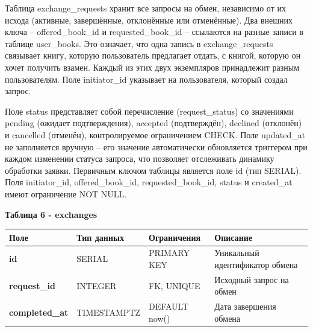 \documentclass[14pt,a4paper]{extarticle}
\begin{document}
Таблица exchange\_requests хранит все запросы на обмен, независимо от их
исхода (активные, завершённые, отклонённые или отменённые). Два внешних
ключа -- offered\_book\_id и requested\_book\_id -- ссылаются на разные
записи в таблице user\_books. Это означает, что одна запись в
exchange\_requests связывает книгу, которую пользователь предлагает
отдать, с книгой, которую он хочет получить взамен. Каждый из этих двух
экземпляров принадлежит разным пользователям. Поле initiator\_id
указывает на пользователя, который создал запрос.

Поле status представляет собой перечисление (request\_status) со
значениями pending (ожидает подтверждения), accepted (подтверждён),
declined (отклонён) и cancelled (отменён), контролируемое ограничением
CHECK. Поле updated\_at не заполняется вручную -- его значение
автоматически обновляется триггером при каждом изменении статуса
запроса, что позволяет отслеживать динамику обработки заявки. Первичным
ключом таблицы является поле id (тип SERIAL). Поля initiator\_id,
offered\_book\_id, requested\_book\_id, status и created\_at имеют
ограничение NOT NULL.

\textbf{Таблица 6 - exchanges}


\begin{longtable}[]{@{}
  >{\centering\arraybackslash}p{}
  >{\centering\arraybackslash}p{}
  >{\centering\arraybackslash}p{}
  >{\centering\arraybackslash}p{}@{}}
\toprule\noalign{}
\begin{minipage}[b]{\linewidth}\centering
\textbf{Поле}
\end{minipage} & \begin{minipage}[b]{\linewidth}\centering
\textbf{Тип данных}
\end{minipage} & \begin{minipage}[b]{\linewidth}\centering
\textbf{Ограничения}
\end{minipage} & \begin{minipage}[b]{\linewidth}\centering
\textbf{Описание}
\end{minipage} \\
\midrule\noalign{}
\endhead
\bottomrule\noalign{}
\endlastfoot
\textbf{id} & SERIAL & PRIMARY KEY & Уникальный идентификатор обмена \\
\textbf{request\_id} & INTEGER & FK, UNIQUE & Исходный запрос на
обмен \\
\textbf{completed\_at} & TIMESTAMPTZ & DEFAULT now() & Дата завершения
обмена \\
\end{longtable}
\end{document}
